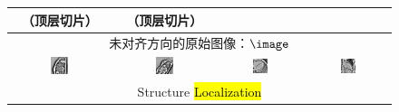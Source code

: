 \renewcommand{\captiontitle}{CNN 分割失败的例子}
\begin{figure}
\begin{center}

\setlength{\tabcolsep}{1pt}

\begin{tabular}{cccc}

\toprule
\SA{}（顶层切片） & \SA{}（顶层切片） & \HLA{} & \VLA{} \\
\midrule

\multicolumn{4}{c}{未对齐方向的原始图像：$\image$} \\

\includegraphics[width=0.19\textwidth]{./data/failures/HCMNet_2000062/00_SAX/9/9.png} &
\includegraphics[width=0.19\textwidth]{./data/failures/HCMNet_2400044/00_SAX/2/5.png} &
\includegraphics[width=0.19\textwidth]{./data/failures/HCMNet_2600079/01_HLA/00/0.png} &
\includegraphics[width=0.19\textwidth]{./data/failures/HCMNet_2600079/02_VLA/00/0.png} \\

\multicolumn{4}{c}{Structure \hl{Localization}} \\


\end{tabular}
\end{center}
\end{figure}
